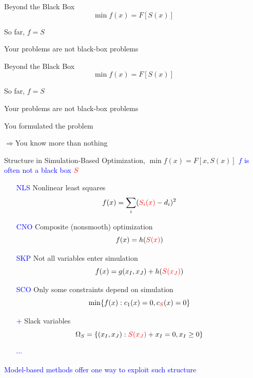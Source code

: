 \documentclass[handout,aspectratio=54]{beamer}
\numberwithin{theorem}{section}
\begin{document}
\begin{frame}{Beyond the Black Box}
\begin{equation*}
\min f(x)=F[S(x)]
\end{equation*}

So far, $f=S$

Your problems are not black-box problems

\vspace{1.5cm}
\end{frame}

\begin{frame}{Beyond the Black Box}
\begin{equation*}
\min f(x)=F[S(x)]
\end{equation*}

So far, $f=S$

Your problems are not black-box problems

You formulated the problem

\flushright$\Rightarrow$You know more than nothing
\end{frame}

\begin{frame}{Structure in Simulation-Based Optimization, $\min f(x)=F[x,S(x)]$}
\footnotesize\textcolor{blue}{$f$ is often not a black box} $\textcolor{red}{S}$

\begin{itemize}\footnotesize
\item[\textcolor{blue}{NLS}] Nonlinear least squares
\begin{equation*}
f(x)=\sum_i(\textcolor{red}{S_i(x)}-d_i)^2
\end{equation*}
\item[\textcolor{blue}{CNO}] Composite (nonsmooth) optimization
\begin{equation*}
f(x)=h(\textcolor{red}{S(x)})
\end{equation*}
\item[\textcolor{blue}{SKP}] Not all variables enter simulation
\begin{equation*}
f(x)=g(x_I,x_J)+h(\textcolor{red}{S(x_J)})
\end{equation*}
\item[\textcolor{blue}{SCO}] Only some constraints depend on simulation
\begin{equation*}
\min\{f(x):c_1(x)=0,c_{\textcolor{red}{S}}(x)=0\}
\end{equation*}
\item[\textcolor{blue}{+}] Slack variables
\begin{equation*}
\Omega_S=\{(x_I,x_J):\textcolor{red}{S(x_J)}+x_I=0,x_I\ge0\}
\end{equation*}
\item[\textcolor{blue}{$\cdots$}]
\end{itemize}
\footnotesize\flushright\textcolor{blue}{Model-based methods offer one way to exploit such structure}
\end{frame}
\end{document}
